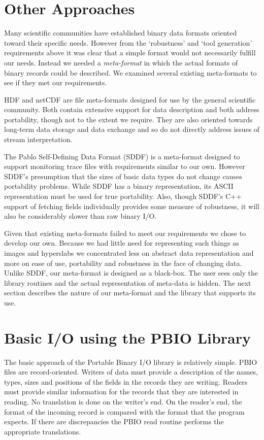 \documentclass{article}
\begin{document}
\section{Other Approaches}

Many scientific communities have established binary data formats oriented
toward their specific needs.  However from the `robustness' and `tool
generation' requirements above it was clear that a simple format would not
necessarily fulfill our needs.  Instead we needed a {\it meta-format} in which
the actual formats of binary records could be described.  We examined several
existing meta-formats to see if they met our requirements.

HDF\cite{hdf_man} and netCDF\cite{netcdf_man} are file meta-formats designed
for use by the general scientific community.  Both contain extensive support
for data description and both address portability, though not to the extent we
require.   They are also oriented towards long-term data storage and data
exchange and so do not directly address issues of stream interpretation.  

The Pablo Self-Defining Data Format (SDDF)\cite{sddf_man} is a meta-format
designed to support monitoring trace files with requirements similar to our
own.  However SDDF's presumption that the sizes of basic data types do not
change causes portability problems.  While SDDF has a binary representation,
its ASCII representation must be used for true portability.  Also, though
SDDF's C++ support of fetching fields individually provides some measure of
robustness, it will also be considerably slower than raw binary I/O.  

Given that existing meta-formats failed to meet our requirements we chose to
develop our own.  Because we had little need for representing such things as
images and hyperslabs we concentrated less on abstract data representation and
more on ease of use, portability and robustness in the face of changing data.
Unlike SDDF, our meta-format is designed as a black-box.  The user sees only
the library routines and the actual representation of meta-data is hidden.
The next section describes the nature of our meta-format and the library that
supports its use.  


\section{Basic I/O using the PBIO Library}

The basic approach of the Portable Binary I/O library is relatively simple.
PBIO files are record-oriented.  Writers of data must provide a description of
the names, types, sizes and positions of the fields in the records they are
writing.  Readers must provide similar information for the records that they
are interested in reading.  No translation is done on the writer's end.  On
the reader's end, the format of the incoming record is compared with the
format that the program expects.  If there are discrepancies the PBIO read
routine performs the appropriate translations.
\end{document}
